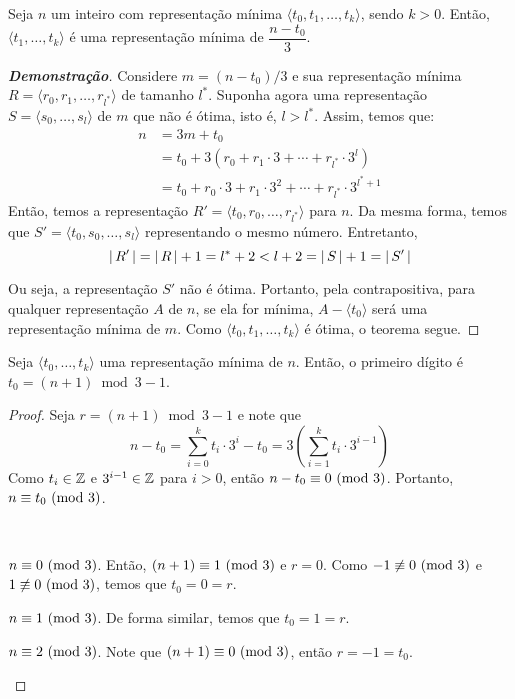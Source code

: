\begin{theorem}
    Seja $n$ um inteiro com representação mínima $\langle t_0, t_1, \ldots, t_k \rangle$, sendo $k > 0$. Então, $\langle t_1, \ldots, t_k \rangle$ é uma representação mínima de $\dfrac{n - t_0}{3}$.
\end{theorem}

\begin{proof}[\textbf{Demonstração}]
    Considere $m = (n - t_0) / 3$ e sua representação mínima $R = \langle r_0, r_1, \ldots, r_{l^*} \rangle$ de tamanho $l^*$. Suponha agora uma representação $S = \langle s_0, \ldots, s_l \rangle$ de $m$ que não é ótima, isto é, $l > l^*$. Assim, temos que:
    \begin{align*}
        n &= 3 m + t_0 \\
        &= t_0 + 3 \left(r_0 + r_1 \cdot 3 + \cdots + r_{l^*} \cdot 3^l\right) \\
        &= t_0 + r_0 \cdot 3 + r_1 \cdot 3^2 + \cdots + r_{l^*} \cdot 3^{l^*+1}
    \end{align*}
    Então, temos a representação $R' = \langle t_0, r_0, \ldots, r_{l^*} \rangle$ para $n$. Da mesma forma, temos que $S' = \langle t_0, s_0, \ldots, s_l \rangle$ representando o mesmo número. Entretanto,
    \[
        {\lvert\,R'\,\rvert} = {\lvert\,R\,\rvert} + 1 = l^* + 2 < l + 2 = {\lvert\,S\,\rvert} + 1 = {\lvert\,S'\,\rvert}
    \]

    Ou seja, a representação $S'$ não é ótima. Portanto, pela contrapositiva, para qualquer representação $A$ de $n$, se ela for mínima, $A - \langle t_0 \rangle$ será uma representação mínima de $m$. Como $\langle t_0, t_1, \ldots, t_k \rangle$ é ótima, o teorema segue.
\end{proof}

\itemdsep

\begin{theorem}
    Seja $\langle t_0, \ldots, t_k \rangle$ uma representação mínima de $n$. Então, o primeiro dígito é $t_0 = (n + 1) \bmod 3 - 1$.
\end{theorem}

\begin{proof}
    Seja $r = (n + 1) \bmod 3 - 1$ e note que
    \[
        n - t_0 = \sum_{i = 0}^k t_i \cdot 3^i - t_0 = 3 \left(\sum_{i = 1}^k t_i \cdot 3^{i-1} \right)
    \]
    Como $t_i \in \operatorname{\mathbb{Z}}$ e $3^{i - 1} \in \operatorname{\mathbb{Z}}$ para $i > 0$, então $n - t_0 \equiv 0 \ (\mathrm{mod}\ 3)$. Portanto, $n \equiv t_0 \ (\mathrm{mod}\ 3)$.

    ~

    \begin{casos}
        \item $n \equiv 0 \ (\mathrm{mod}\ 3)$. Então, $(n + 1) \equiv 1 \ (\mathrm{mod}\ 3)$ e $r = 0$. Como $-1 \not\equiv 0 \ (\mathrm{mod}\ 3)$ e $1 \not\equiv 0 \ (\mathrm{mod}\ 3)$, temos que $t_0 = 0 = r$.
        \item $n \equiv 1 \ (\mathrm{mod}\ 3)$. De forma similar, temos que $t_0 = 1 = r$.
        \item $n \equiv 2 \ (\mathrm{mod}\ 3)$. Note que $(n + 1) \equiv 0 \ (\mathrm{mod}\ 3)$, então $r = -1 = t_0$.
    \end{casos}
\end{proof}

